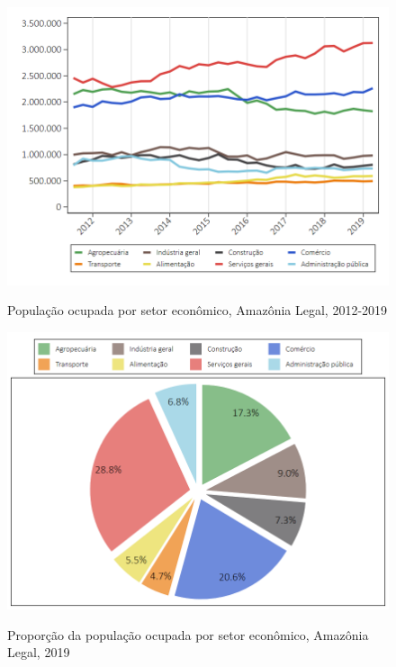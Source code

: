 \documentclass[8pt]{beamer}
\begin{document}
\begin{frame}[label=_importancia_relativa]

\begin{figure}
  \centering
  \includegraphics[width=.85\linewidth]{./../analysis/output/_importancia_relativa.png}
  \label{_importancia_relativa}
  \caption{{População ocupada por setor econômico, Amazônia Legal, 2012-2019}}
\end{figure}
\end{frame}



\begin{frame}[label=_importancia_relativa]

\begin{figure}
  \centering
  \includegraphics[width=.85\linewidth]{./../analysis/output/_importancia_relativa_pizza.png}
  \label{_importancia_relativa}
  \caption{{Proporção da população ocupada por setor econômico, Amazônia Legal, 2019}}
\end{figure}
\end{frame}
\end{document}
